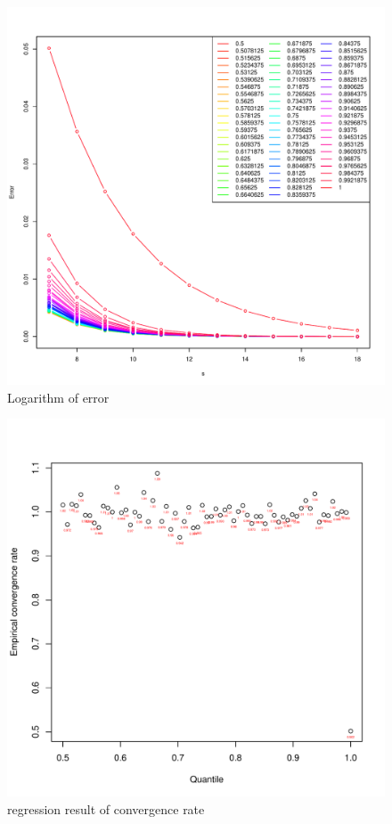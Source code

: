 \documentclass[12pt,oneside,titlepage]{book}
\begin{document}
 \begin{figure}[htbp]
   \centering
   \includegraphics{nout_7_27_llines.pdf} %
   \caption{Logarithm of error}
\end{figure}
 
 \begin{figure}[htbp]
   \centering
   \includegraphics{nout_7_27_rato.pdf} %
   \caption{regression result of convergence rate}
\end{figure}
\end{document}
